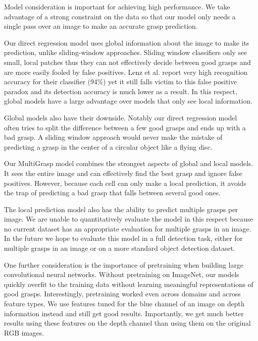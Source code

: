 \documentclass[letterpaper, 10 pt, conference]{ieeeconf}
\begin{document}
Model consideration is important for achieving high performance. We take advantage of a strong constraint on the data so that our model only needs a single pass over an image to make an accurate grasp prediction.

Our direct regression model uses global information about the image to make its prediction, unlike sliding-window approaches. Sliding window classifiers only see small, local patches thus they can not effectively decide between good grasps and are more easily fooled by false positives. Lenz et al. report very high recognition accuracy for their classifier (94\%) yet it still falls victim to this false positive paradox and its detection accuracy is much lower as a result. In this respect, global models have a large advantage over models that only see local information.

Global models also have their downside. Notably our direct regression model often tries to split the difference between a few good grasps and ends up with a bad grasp. A sliding window approach would never make the mistake of predicting a grasp in the center of a circular object like a flying disc.

Our MultiGrasp model combines the strongest aspects of global and local models. It sees the entire image and can effectively find the best grasp and ignore false positives. However, because each cell can only make a local prediction, it avoids the trap of predicting a bad grasp that falls between several good ones.

The local prediction model also has the ability to predict multiple grasps per image. We are unable to quantitatively evaluate the model in this respect because no current dataset has an appropriate evaluation for multiple grasps in an image. In the future we hope to evaluate this model in a full detection task, either for multiple grasps in an image or on a more standard object detection dataset. 

One further consideration is the importance of pretraining when building large convolutional neural networks. Without pretraining on ImageNet, our models quickly overfit to the training data without learning meaningful representations of good grasps. Interestingly, pretraining worked even across domains and across feature types. We use features tuned for the blue channel of an image on depth information instead and still get good results. Importantly, we get much better results using these features on the depth channel than using them on the original RGB images.
\end{document}
